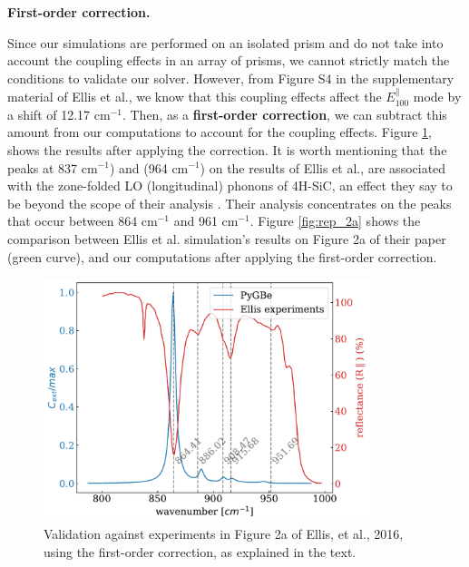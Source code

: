 \textbf{First-order correction.} 

Since our simulations are performed on an isolated prism and do not take into account the coupling effects 
in an array of prisms, we cannot strictly match the conditions to validate our solver. However, from Figure S4 in the supplementary material of 
Ellis et al., we know that this coupling effects affect the $E^{\parallel}_{100}$ mode by a shift of 12.17 cm$^{-1}$. Then, as a 
\textbf{first-order correction}, we can subtract this amount from our computations to account for the coupling effects. Figure \ref{fig:val_2a}, 
shows the results after applying the correction. It is worth mentioning that the peaks at 837 cm$^{-1}$) and (964 cm$^{-1}$) on the results of Ellis et al., 
are associated with the zone-folded LO (longitudinal) phonons of 4H-SiC, an effect they say to be beyond the scope of their analysis \cite{ellis2016}. Their 
analysis concentrates on the peaks that occur between 864 cm$^{-1}$ and 961 cm$^{-1}$. 
Figure \ref{fig:rep_2a} shows the comparison between Ellis et al. simulation's results on Figure 2a of their paper (green curve), and our computations
after applying the first-order correction.

\begin{figure}
    \centering
    \includegraphics[width=0.85\textwidth]{validation_FOA_fig2a_Ellis.pdf} 
    \caption{Validation against experiments in Figure 2a of Ellis, et al., 2016, using the first-order correction, as explained in the text.}
    \label{fig:val_2a}
 \end{figure}

